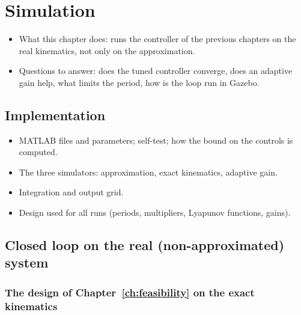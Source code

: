 
\chapter{Simulation}
\label{ch:simulation}

\begin{itemize}
  \item What this chapter does: runs the controller of the previous chapters on the real kinematics, not only on the approximation.
  \item Questions to answer: does the tuned controller converge, does an adaptive gain help, what limits the period, how is the loop run in Gazebo.
\end{itemize}

\section{Implementation}
\label{sec:sim-impl}

\begin{itemize}
  \item MATLAB files and parameters; self-test; how the bound on the controls is computed.
  \item The three simulators: approximation, exact kinematics, adaptive gain.
  \item Integration and output grid.
  \item Design used for all runs (periods, multipliers, Lyapunov functions, gains).
\end{itemize}

\section{Closed loop on the real (non-approximated) system}
\label{sec:sim-exact}

\subsection{The design of Chapter~\ref{ch:feasibility} on the exact kinematics}

